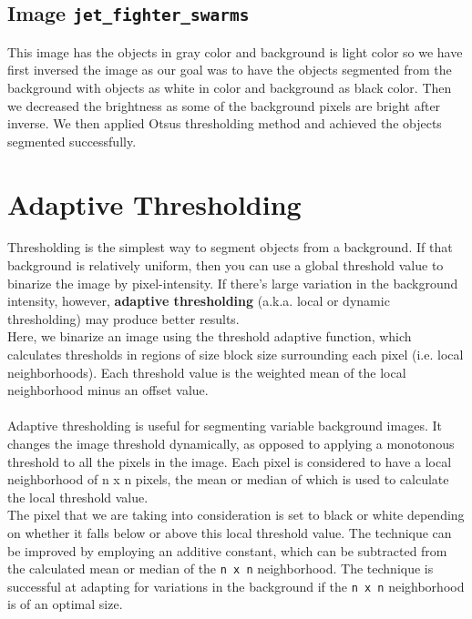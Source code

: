 \subsection{Image \texttt{jet\_fighter\_swarms}}
This image has the objects in gray color and background is light color so we have first inversed the image as our goal was to have the objects segmented from the background with objects as white in color and background as black color. Then we decreased the brightness as some of the background pixels are bright after inverse. We then applied Otsus thresholding method and achieved the objects segmented successfully.

\section{Adaptive Thresholding}
Thresholding is the simplest way to segment objects from a background. If that background is relatively uniform, then you can use a global threshold value to binarize the image by pixel-intensity. If there’s large variation in the background intensity, however, \textbf{adaptive thresholding} (a.k.a. local or dynamic thresholding) may produce better results.
\\
Here, we binarize an image using the threshold adaptive function, which calculates thresholds in regions of size block size surrounding each pixel (i.e. local neighborhoods). Each threshold value is the weighted mean of the local neighborhood minus an offset value.
\\
\\
Adaptive thresholding is useful for segmenting variable background images. It changes the image threshold dynamically, as opposed to applying a monotonous threshold to all the pixels in the image. Each pixel is considered to have a local neighborhood of n x n pixels, the mean or median of which is used to calculate the local threshold value. 
\\
The pixel that we are taking into consideration is set to black or white depending on whether it falls below or above this local threshold value. The technique can be improved by employing an additive constant, which can be subtracted from the calculated mean or median of the \texttt{n x n} neighborhood. The technique is successful at adapting for variations in the background if the \texttt{n x n} neighborhood is of an optimal size.

